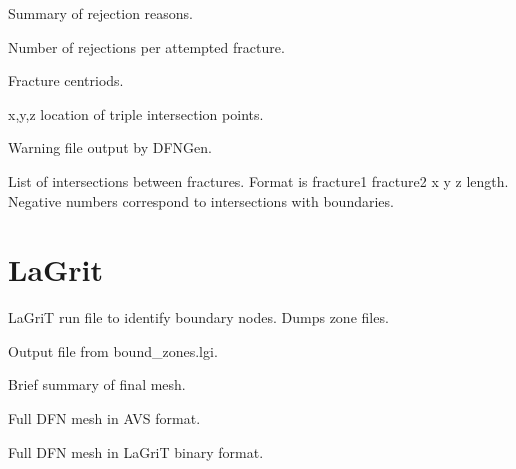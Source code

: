 \documentclass[letterpaper,10pt,english]{sphinxmanual}
\begin{document}

\label{\detokenize{output:rejections-dat}}
Summary of rejection reasons.


\label{\detokenize{output:rejectsperattempt-dat}}
Number of rejections per attempted fracture.


\label{\detokenize{output:translations-dat}}
Fracture centriods.


\label{\detokenize{output:triple-points-dat}}
x,y,z location of triple intersection points.


\label{\detokenize{output:warningfiledfngen-txt}}
Warning file output by DFNGen.


\label{\detokenize{output:intersection-list-dat}}
List of intersections between fractures. Format is fracture1 fracture2 x y z length. Negative numbers correspond to intersections with boundaries.


\section{LaGrit}
\label{\detokenize{output:lagrit}}

\label{\detokenize{output:bound-zones-lgi}}
LaGriT run file to identify boundary nodes. Dumps zone files.


\label{\detokenize{output:boundary-output-txt}}
Output file from bound\_zones.lgi.


\label{\detokenize{output:finalmesh-txt}}
Brief summary of final mesh.


\label{\detokenize{output:full-mesh-inp}}
Full DFN mesh in AVS format.


\label{\detokenize{output:full-mesh-lg}}
Full DFN mesh in LaGriT binary format.
\end{document}

